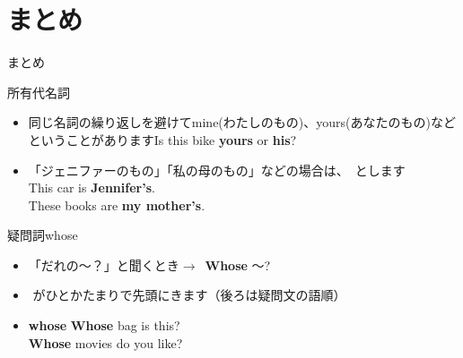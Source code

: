 \documentclass[aspectratio=169,xcolor={dvipsnames,table}]{beamer}
\begin{document}
\section{まとめ}
\begin{frame}[plain]{まとめ}
 \begin{exampleblock}{所有代名詞}
\begin{itemize}[square]\small
 \item 同じ名詞の繰り返しを避けてmine(わたしのもの)、yours(あなたのもの)などということがあります\hfill{\scriptsize Is this bike {\bfseries yours} or {\bfseries his}?}
 \item 「ジェニファーのもの」「私の母のもの」などの場合は、
\,とします\\
\hfill{\scriptsize This car is {\bfseries Jennifer's}.}\\
\hfill{\scriptsize These books are {\bfseries my mother's}.}
\end{itemize}
     \end{exampleblock}
\pause
\begin{exampleblock}{疑問詞whose }
\begin{itemize}[square]\small
 \item 「だれの～？」と聞くとき$\longrightarrow$\,\,\,{\bfseries Whose} 〜?
 \item  {}\,\,がひとかたまりで先頭にきます（後ろは疑問文の語順）
 \item {\bfseries whose} \hfill{\scriptsize {\bfseries Whose} bag is this?}\\\hfill{\scriptsize {\bfseries Whose} movies do you like?}
\end{itemize}
     \end{exampleblock}
\hfill{\scriptsize {}}

\end{frame}
\end{document}
